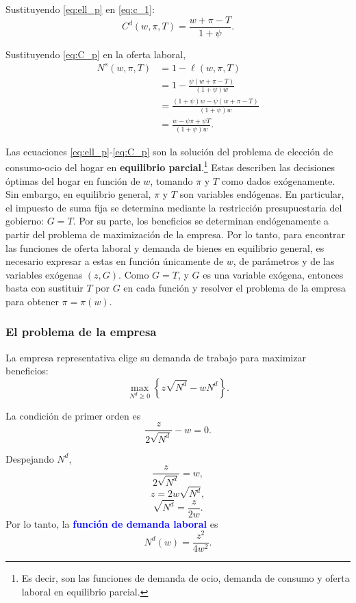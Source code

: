 \documentclass[11pt]{article}
\begin{document}
Sustituyendo \eqref{eq:ell_p} en \eqref{eq:c_1}:
\begin{equation}
C^d(w,\pi,T) = 
\frac{w+\pi-T}{1+\psi}. \label{eq:C_p}
\end{equation}

Sustituyendo \eqref{eq:C_p} en la oferta laboral,
\begin{align*}
N^s(w,\pi,T)
&=1-\ell(w,\pi,T)\\
&=1-\frac{\psi(w+\pi-T)}{(1+\psi)w}\\
&=\frac{(1+\psi)w-\psi(w+\pi-T)}
        {(1+\psi)w}\\
&=\frac{w-\psi\pi+\psi T}{(1+\psi)w}.
\end{align*}

Las ecuaciones \eqref{eq:ell_p}-\eqref{eq:C_p} son la solución del problema de elección de consumo-ocio del hogar en \textbf{equilibrio parcial}.\footnote{Es decir, son las funciones de demanda de ocio, demanda de consumo y oferta laboral en equilibrio parcial.} Estas describen las decisiones óptimas del hogar en función de \(w\), tomando \(\pi\) y \(T\) como dados exógenamente. Sin embargo, en equilibrio general, \(\pi\) y \(T\) son variables endógenas. En particular, el impuesto de suma fija se determina mediante la restricción presupuestaria del gobierno: $G = T.$ Por su parte, los beneficios se determinan endógenamente a partir del problema de maximización de la empresa. Por lo tanto, para encontrar las funciones de oferta laboral y demanda de bienes en equilibrio general, es necesario expresar a estas en función únicamente de $w$, de parámetros y de las variables exógenas \((z,G)\). Como $G=T$, y $G$ es una variable exógena, entonces basta con sustituir $T$ por $G$ en cada función y resolver el problema de la empresa para obtener \(\pi=\pi(w)\).

\subsubsection*{El problema de la empresa}

La empresa representativa elige su demanda de trabajo para maximizar
beneficios:
\[
\max_{N^d\geq 0}
\left\{
z\sqrt{N^d}-wN^d
\right\}.
\]

La condición de primer orden es
\[
\frac{z}{2\sqrt{N^d}}-w=0.
\]

Despejando \(N^d\),
\[
\frac{z}{2\sqrt{N^d}}=w,
\]
\[
z=2w\sqrt{N^d},
\]
\[
\sqrt{N^d}=\frac{z}{2w}.
\]
Por lo tanto, la \textcolor{blue}{\textbf{función de demanda laboral}} es
\begin{equation}
  \boxed{
N^d(w)=\frac{z^2}{4w^2}\label{eq:N_d}
}.
\end{equation}
\end{document}
